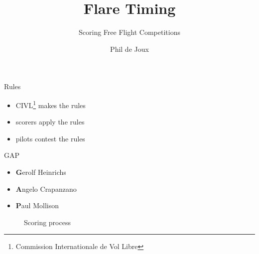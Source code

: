 \documentclass{beamer}
\title{Flare Timing}
\subtitle{Scoring Free Flight Competitions}
\author{Phil de Joux}
\institute{Block Scope}
\date{}
\begin{document}
\begin{frame}
\titlepage
\end{frame}

\begin{frame}{Rules}
\begin{itemize}
    \item CIVL\footnote{Commission Internationale de Vol Libre} makes the rules
    \item scorers apply the rules
    \item pilots contest the rules
\end{itemize}
\end{frame}

\begin{frame}{GAP}
\begin{itemize}
    \item \textbf{G}erolf Heinrichs
    \item \textbf{A}ngelo Crapanzano
    \item \textbf{P}aul Mollison
\end{itemize}
\end{frame}

\begin{frame}
\begin{figure}[!ht]
    \centering
    
    \caption{Scoring process}
    \label{fig:scoring-process}
\end{figure}
\end{frame}
\end{document}
